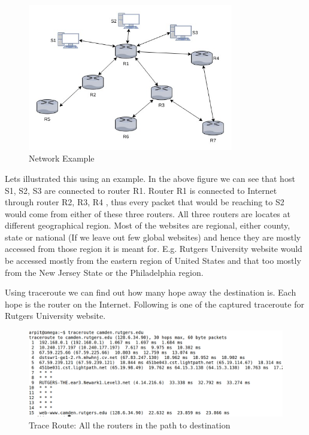 \documentclass[10pt,oneside,a4paper]{article}
\begin{document}
\begin{figure}[H]
\centering
\includegraphics[width=0.80\textwidth]{Routers}
\caption{Network Example} \label{fig:routers}
\end{figure}


Lets illustrated this using an example. In the above figure we can see that host S1, S2, S3 are connected to router R1. Router R1 is connected to Internet through router R2, R3, R4 , thus every packet that would be reaching to S2 would come from either of these three routers. All three routers are locates at different geographical region. Most of the websites are regional, either county, state or national (If we leave out few global websites) and hence they are mostly accessed from those region it is meant for. E.g. Rutgers University website would be accessed mostly from the eastern region of United States and that too mostly from the New Jersey State or the Philadelphia region.\par
Using traceroute we can find out how many hope away the destination is. Each hope is the router on the Internet. Following is one of the captured traceroute for Rutgers University website.\par
\begin{figure}[H]
\centering
\includegraphics[width=\textwidth]{TraceRoute}
\caption{Trace Route: All the routers in the path to destination} \label{fig:traceroute}
\end{figure}
\end{document}
